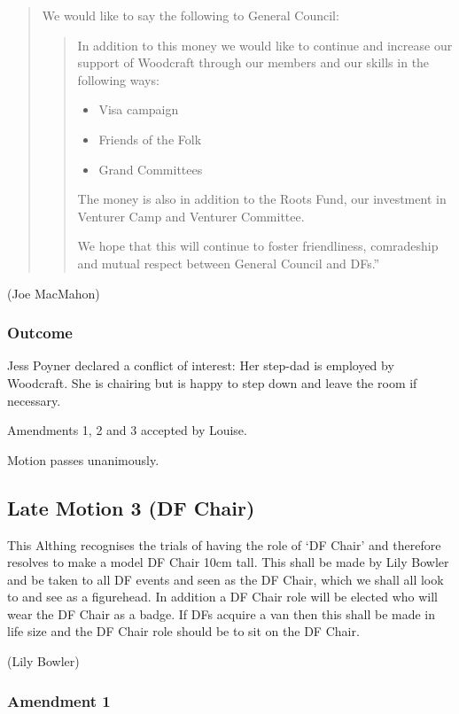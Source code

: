 \documentclass[a4paper, 11pt]{article} %
\begin{document}
\begin{quote}
We would like to say the following to General Council:
	\begin{quotation}
	In addition to this money we would like to continue and increase our support of Woodcraft through our members and our skills in the following ways:
	\begin{itemize}
	\item Visa campaign
	\item Friends of the Folk
	\item Grand Committees
	\end{itemize}
	
	The money is also in addition to the Roots Fund, our investment in Venturer Camp and Venturer Committee.

	We hope that this will continue to foster friendliness, comradeship and mutual respect between General Council and DFs.''
	\end{quotation}
\end{quote}

(Joe MacMahon)

\subsubsection{Outcome}

Jess Poyner declared a conflict of interest: Her step-dad is employed by Woodcraft.  She is chairing but is happy to step down and leave the room if necessary.

Amendments 1, 2 and 3 accepted by Louise.

Motion passes unanimously.

\subsection{Late Motion 3 (DF Chair)}
This Althing recognises the trials of having the role of `DF Chair' and therefore resolves to make a model DF Chair 10cm tall.  This shall be made by Lily Bowler and be taken to all DF events and seen as the DF Chair, which we shall all look to and see as a figurehead.  In addition a DF Chair role will be elected who will wear the DF Chair as a badge.  If DFs acquire a van then this shall be made in life size and the DF Chair role should be to sit on the DF Chair.

(Lily Bowler)

\subsubsection{Amendment 1}
\end{document}
